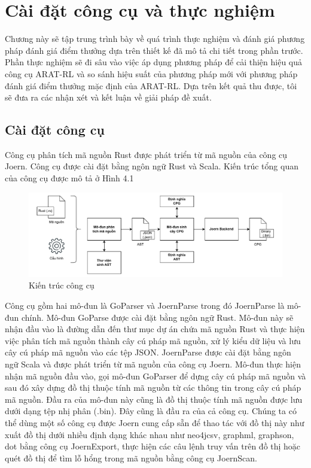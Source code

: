 \chapter{Cài đặt công cụ và thực nghiệm}
\label{chap:experiment}

Chương này sẽ tập trung trình bày về quá trình thực nghiệm và đánh giá phương pháp đánh giá điểm thưởng dựa trên thiết kế đã mô tả chi tiết trong phần trước. Phần thực nghiệm sẽ đi sâu vào việc áp dụng phương pháp để cải thiện hiệu quả công cụ ARAT-RL và so sánh hiệu suất của phương pháp mới với phương pháp đánh giá điểm thưởng mặc định của ARAT-RL. Dựa trên kết quả thu được, tôi sẽ đưa ra các nhận xét và kết luận về giải pháp đề xuất.

\section{Cài đặt công cụ}

Công cụ phân tích mã nguồn Rust được phát triển từ mã nguồn của công cụ Joern.
Công cụ được cài đặt bằng ngôn ngữ Rust và Scala. Kiến trúc tổng quan của công cụ được
mô tả ở Hình 4.1

\begin{figure}[H]
	\includegraphics[width=1\columnwidth]{figures/c4/c4_install_flow.drawio.pdf}
	\centering
	\caption{Kiến trúc công cụ}
	\label{img:experimental_install_flow}
\end{figure}

Công cụ gồm hai mô-đun là GoParser và JoernParse trong đó JoernParse là mô-đun
chính. Mô-đun GoParse được cài đặt bằng      ngôn ngữ Rust. Mô-đun này sẽ nhận đầu vào là
đường dẫn đến thư mục dự án chứa mã nguồn Rust và thực hiện việc phân tích mã nguồn
thành cây cú pháp mã nguồn, xử lý kiểu dữ liệu và lưu cây cú pháp mã nguồn vào các
tệp JSON. JoernParse được cài đặt bằng ngôn ngữ Scala và được phát triển từ mã nguồn
của công cụ Joern. Mô-đun thực hiện nhận mã nguồn đầu vào, gọi mô-đun GoParser để
dựng cây cú pháp mã nguồn và sau đó xây dựng đồ thị thuộc tính mã nguồn từ các thông
tin trong cây cú pháp mã nguồn. Đầu ra của mô-đun này cũng là đồ thị thuộc tính mã
nguồn được lưu dưới dạng tệp nhị phân (.bin). Đây cũng là đầu ra của cả công cụ. Chúng
ta có thể dùng một số công cụ được Joern cung cấp sẵn để thao tác với đồ thị này như xuất đồ thị dưới nhiều định dạng khác nhau như neo4jcsv, graphml, graphson, dot bằng
công cụ JoernExport, thực hiện các câu lệnh truy vấn trên đồ thị hoặc quét đồ thị để tìm
lỗ hổng trong mã nguồn bằng công cụ JoernScan.

